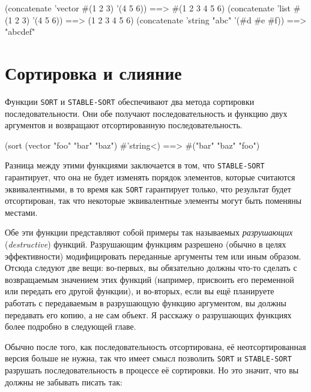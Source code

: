 \begin{myverb}
(concatenate 'vector #(1 2 3) '(4 5 6))    ==> #(1 2 3 4 5 6)
(concatenate 'list #(1 2 3) '(4 5 6))      ==> (1 2 3 4 5 6)
(concatenate 'string "abc" '(#\bslash{}d #\bslash{}e #\bslash{}f)) ==> "abcdef"
\end{myverb}

\section{Сортировка и слияние}

Функции \lstinline{SORT} и \lstinline{STABLE-SORT} обеспечивают два метода сортировки
последовательности.  Они обе получают последовательность и функцию двух аргументов и
возвращают отсортированную последовательность.

\begin{myverb}
(sort (vector "foo" "bar" "baz") #'string<) ==> #("bar" "baz" "foo")
\end{myverb}

Разница между этими функциями заключается в том, что \lstinline{STABLE-SORT} гарантирует, что
она не будет изменять порядок элементов, которые считаются эквивалентными, в то время как
\lstinline{SORT} гарантирует только, что результат будет отсортирован, так что некоторые
эквивалентные элементы могут быть поменяны местами.

Обе эти функции представляют собой примеры так называемых \textit{разрушающих} (\textit{destructive}) функций.  Разрушающим
функциям разрешено (обычно в целях эффективности) модифицировать переданные аргументы тем
или иным образом.  Отсюда следуют две вещи: во-первых, вы обязательно должны что-то сделать с
возвращаемым значением этих функций (например, присвоить его переменной или передать его
другой функции), и во-вторых, если вы ещё планируете работать с передаваемым в
разрушающую функцию аргументом, вы должны передавать его копию, а не сам объект.
Я расскажу о разрушающих функциях более подробно в следующей главе.

Обычно после того, как последовательность отсортирована, её неотсортированная версия
больше не нужна, так что имеет смысл
позволить \lstinline{SORT} и \lstinline{STABLE-SORT} разрушать последовательность в процессе её
сортировки.  Но это значит, что вы должны не забывать писать так:


